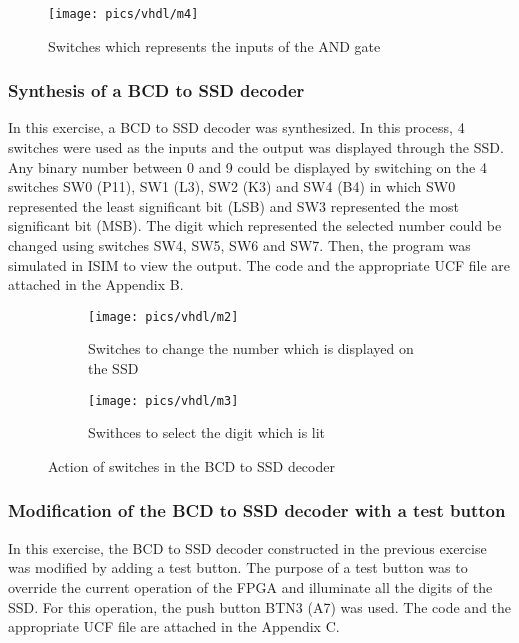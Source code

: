 \begin{figure}[!h]
	\centering
	\texttt{[image: pics/vhdl/m4]}
	\caption{Switches which represents the inputs of the AND gate}
	\label{fig:m4}
\end{figure}

\subsubsection{Synthesis of a BCD to SSD decoder}

\noindent
In this exercise,  a BCD to SSD decoder was synthesized. In this process, 4 switches were used as the inputs and the output was displayed through the SSD. Any binary number between 0 and 9 could be displayed by switching on the 4 switches SW0 (P11), SW1 (L3), SW2 (K3) and SW4 (B4) in which SW0 represented the least significant bit (LSB) and SW3 represented the most significant bit (MSB). The digit which represented the selected number could be changed using switches SW4, SW5, SW6 and SW7. Then, the program was simulated in ISIM to view the output. The  code and the appropriate UCF file are attached in the Appendix B.   

\begin{figure}[!h]
	\centering
	\begin{subfigure}{.5\textwidth}
		\centering
		\texttt{[image: pics/vhdl/m2]}
		\caption{Switches to change the number which is displayed on the SSD }
		\label{fig:sub1}
	\end{subfigure}%
	\begin{subfigure}{.5\textwidth}
		\centering
		\texttt{[image: pics/vhdl/m3]}
		\caption{Swithces to select the digit which is lit}
		\label{fig:sub2}
	\end{subfigure}
	\caption{Action of switches in the BCD to SSD decoder}
	\label{fig:sub2}
\end{figure}

\pagebreak

\subsubsection{Modification of the BCD to SSD decoder with a test button}

\noindent
In this exercise, the BCD to SSD decoder constructed in the previous exercise was modified by adding a test button. The purpose of a test button was to override the current operation of the FPGA and illuminate all the digits of the SSD. For this operation, the push button BTN3 (A7) was used. The  code and the appropriate UCF file are attached in the Appendix C.
 

